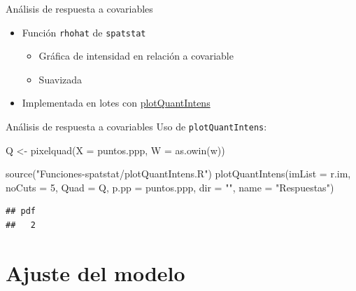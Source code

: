 \documentclass[
  11pt,
  ignorenonframetext,
]{beamer}
\newenvironment{Shaded}{}{}
\newcommand{\AttributeTok}[1]{\textcolor[rgb]{0.49,0.56,0.16}{#1}}
\newcommand{\DecValTok}[1]{\textcolor[rgb]{0.25,0.63,0.44}{#1}}
\newcommand{\FunctionTok}[1]{\textcolor[rgb]{0.02,0.16,0.49}{#1}}
\newcommand{\NormalTok}[1]{#1}
\newcommand{\OtherTok}[1]{\textcolor[rgb]{0.00,0.44,0.13}{#1}}
\newcommand{\StringTok}[1]{\textcolor[rgb]{0.25,0.44,0.63}{#1}}
\providecommand{\tightlist}{%
  \setlength{\itemsep}{0pt}\setlength{\parskip}{0pt}}
\begin{document}
\begin{frame}[fragile]{Análisis de respuesta a covariables}
\protect\hypertarget{anuxe1lisis-de-respuesta-a-covariables}{}
\begin{itemize}
\item
  Función \texttt{rhohat} de \texttt{spatstat}

  \begin{itemize}
  \tightlist
  \item
    Gráfica de intensidad en relación a covariable
  \item
    Suavizada
  \end{itemize}
\item
  Implementada en lotes con
  \href{Funciones-spatstat/plotQuantIntens.R}{plotQuantIntens}
\end{itemize}
\end{frame}

\begin{frame}[fragile]{Análisis de respuesta a covariables}
\protect\hypertarget{anuxe1lisis-de-respuesta-a-covariables-1}{}
Uso de \texttt{plotQuantIntens}:

\begin{Shaded}
\begin{Highlighting}[]
\NormalTok{Q }\OtherTok{\textless{}{-}} \FunctionTok{pixelquad}\NormalTok{(}\AttributeTok{X =}\NormalTok{ puntos.ppp, }\AttributeTok{W =} \FunctionTok{as.owin}\NormalTok{(w))}

\FunctionTok{source}\NormalTok{(}\StringTok{"Funciones{-}spatstat/plotQuantIntens.R"}\NormalTok{)}
\FunctionTok{plotQuantIntens}\NormalTok{(}\AttributeTok{imList =}\NormalTok{ r.im,}
                \AttributeTok{noCuts =} \DecValTok{5}\NormalTok{,}
                \AttributeTok{Quad =}\NormalTok{ Q,}
                \AttributeTok{p.pp =}\NormalTok{ puntos.ppp,}
                \AttributeTok{dir =} \StringTok{""}\NormalTok{,}
                \AttributeTok{name =} \StringTok{"Respuestas"}\NormalTok{)}
\end{Highlighting}
\end{Shaded}

\begin{verbatim}
## pdf 
##   2
\end{verbatim}
\end{frame}

\hypertarget{ajuste-del-modelo}{%
\section{Ajuste del modelo}\label{ajuste-del-modelo}}
\end{document}
